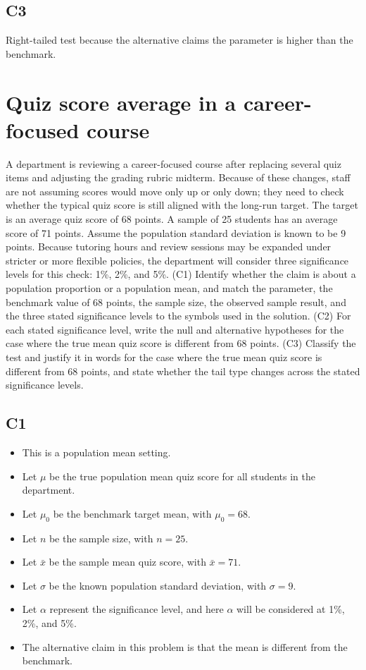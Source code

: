 \begin{ExamProblems}
		\subsection*{C3}
		Right-tailed test because the alternative claims the parameter is higher than the benchmark.\RightTailGraph
		
		\item
		\section{Quiz score average in a career-focused course}
		A department is reviewing a career-focused course after replacing several quiz items and adjusting the grading rubric midterm. Because of these changes, staff are not assuming scores would move only up or only down; they need to check whether the typical quiz score is still aligned with the long-run target. The target is an average quiz score of 68 points. A sample of 25 students has an average score of 71 points. Assume the population standard deviation is known to be 9 points. Because tutoring hours and review sessions may be expanded under stricter or more flexible policies, the department will consider three significance levels for this check: 1\%, 2\%, and 5\%. (C1) Identify whether the claim is about a population proportion or a population mean, and match the parameter, the benchmark value of 68 points, the sample size, the observed sample result, and the three stated significance levels to the symbols used in the solution. (C2) For each stated significance level, write the null and alternative hypotheses for the case where the true mean quiz score is different from 68 points. (C3) Classify the test and justify it in words for the case where the true mean quiz score is different from 68 points, and state whether the tail type changes across the stated significance levels.
		
		\subsection*{C1}
		\begin{itemize}
			\item This is a population mean setting.
			\item Let \(\mu\) be the true population mean quiz score for all students in the department.
			\item Let \(\mu_0\) be the benchmark target mean, with \(\mu_0=68\).
			\item Let \(n\) be the sample size, with \(n=25\).
			\item Let \(\bar{x}\) be the sample mean quiz score, with \(\bar{x}=71\).
			\item Let \(\sigma\) be the known population standard deviation, with \(\sigma=9\).
			\item Let \(\alpha\) represent the significance level, and here \(\alpha\) will be considered at 1\%, 2\%, and 5\%.
			\item The alternative claim in this problem is that the mean is different from the benchmark.
		\end{itemize}
		

\end{ExamProblems}
